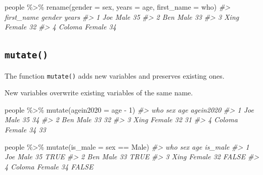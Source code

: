 \documentclass[
]{book}
\newenvironment{Shaded}{\begin{snugshade}}{\end{snugshade}}
\newcommand{\AttributeTok}[1]{\textcolor[rgb]{0.77,0.63,0.00}{#1}}
\newcommand{\CommentTok}[1]{\textcolor[rgb]{0.56,0.35,0.01}{\textit{#1}}}
\newcommand{\DecValTok}[1]{\textcolor[rgb]{0.00,0.00,0.81}{#1}}
\newcommand{\FunctionTok}[1]{\textcolor[rgb]{0.00,0.00,0.00}{#1}}
\newcommand{\NormalTok}[1]{#1}
\newcommand{\SpecialCharTok}[1]{\textcolor[rgb]{0.00,0.00,0.00}{#1}}
\newcommand{\StringTok}[1]{\textcolor[rgb]{0.31,0.60,0.02}{#1}}
\begin{document}
\begin{Shaded}
\begin{Highlighting}[]
\NormalTok{people }\SpecialCharTok{\%\textgreater{}\%} \FunctionTok{rename}\NormalTok{(}\AttributeTok{gender =}\NormalTok{ sex, }\AttributeTok{years =}\NormalTok{ age, }\AttributeTok{first\_name =}\NormalTok{ who)}
\CommentTok{\#\textgreater{}   first\_name gender years}
\CommentTok{\#\textgreater{} 1        Joe   Male    35}
\CommentTok{\#\textgreater{} 2        Ben   Male    33}
\CommentTok{\#\textgreater{} 3       Xing Female    32}
\CommentTok{\#\textgreater{} 4     Coloma Female    34}
\end{Highlighting}
\end{Shaded}

\hypertarget{mutate}{%
\subsection*{\texorpdfstring{\texttt{mutate()}}{mutate()}}\label{mutate}}

The function \texttt{mutate()} adds new variables and preserves existing ones.

New variables overwrite existing variables of the same name.

\begin{Shaded}
\begin{Highlighting}[]
\NormalTok{people }\SpecialCharTok{\%\textgreater{}\%} \FunctionTok{mutate}\NormalTok{(}\AttributeTok{agein2020 =}\NormalTok{ age }\SpecialCharTok{{-}} \DecValTok{1}\NormalTok{)}
\CommentTok{\#\textgreater{}      who    sex age agein2020}
\CommentTok{\#\textgreater{} 1    Joe   Male  35        34}
\CommentTok{\#\textgreater{} 2    Ben   Male  33        32}
\CommentTok{\#\textgreater{} 3   Xing Female  32        31}
\CommentTok{\#\textgreater{} 4 Coloma Female  34        33}
\end{Highlighting}
\end{Shaded}

\begin{Shaded}
\begin{Highlighting}[]
\NormalTok{people }\SpecialCharTok{\%\textgreater{}\%} \FunctionTok{mutate}\NormalTok{(}\AttributeTok{is\_male =}\NormalTok{ sex }\SpecialCharTok{==} \StringTok{\textquotesingle{}Male\textquotesingle{}}\NormalTok{)}
\CommentTok{\#\textgreater{}      who    sex age is\_male}
\CommentTok{\#\textgreater{} 1    Joe   Male  35    TRUE}
\CommentTok{\#\textgreater{} 2    Ben   Male  33    TRUE}
\CommentTok{\#\textgreater{} 3   Xing Female  32   FALSE}
\CommentTok{\#\textgreater{} 4 Coloma Female  34   FALSE}
\end{Highlighting}
\end{Shaded}
\end{document}
